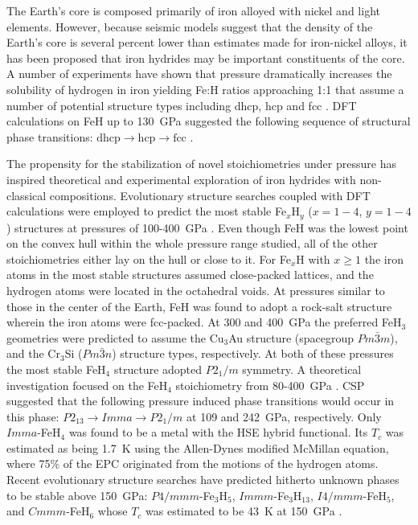 \documentclass[12pt,letterpaper,oneside]{article}
\begin{document}
The Earth's core is composed primarily of iron alloyed with nickel and light elements. However, because seismic models suggest that the density of the Earth's core is several percent lower than estimates made for iron-nickel alloys, it has been proposed that iron hydrides may be important constituents of the core. A number of experiments have shown that pressure dramatically increases the solubility of hydrogen in iron \cite{Fukai:1982} yielding Fe:H ratios approaching 1:1 \cite{Badding:1991} that assume a number of potential structure types including dhcp, hcp and fcc \cite{Yamakata:1992,Antonov:2002,Narygina:2011}. DFT calculations on FeH up to 130~GPa suggested the following sequence of structural phase transitions: $\text{dhcp}\rightarrow \text{hcp} \rightarrow \text{fcc}$ \cite{Isaev:2007}. 

The propensity for the stabilization of novel stoichiometries under pressure has inspired theoretical and experimental exploration of iron hydrides with non-classical compositions.
Evolutionary structure searches coupled with DFT calculations were employed to predict the most stable Fe$_x$H$_y$ ($x=1-4$, $y=1-4$) structures at pressures of 100-400~GPa \cite{Bazhanova:2012a}. Even though FeH was the lowest point on the convex hull within the whole pressure range studied, all of the other stoichiometries either lay on the hull or close to it. For Fe$_x$H with $x\ge1$ the iron atoms in the most stable structures assumed close-packed lattices, and the hydrogen atoms were located in the octahedral voids. At pressures similar to those in the center of the Earth, FeH was found to adopt a rock-salt structure wherein the iron atoms were fcc-packed. At 300 and 400~GPa the preferred FeH$_3$ geometries were predicted to assume the Cu$_3$Au structure (spacegroup $Pm\bar{3}m$), and the Cr$_3$Si ($Pm\bar{3}n$) structure types, respectively. At both of these pressures the most stable FeH$_4$ structure adopted $P2_1/m$ symmetry. A theoretical investigation focused on the FeH$_4$ stoichiometry from 80-400~GPa \cite{Li:2017a}. CSP suggested that the following pressure induced phase transitions would occur in this phase: $P2_13 \rightarrow Imma \rightarrow P2_1/m$ at 109 and 242~GPa, respectively. Only $Imma$-FeH$_4$ was found to be a metal with the HSE hybrid functional. Its $T_c$ was estimated as being 1.7~K using the Allen-Dynes modified McMillan equation, where 75\% of the EPC originated from the motions of the hydrogen atoms. Recent evolutionary structure searches have predicted hitherto unknown phases to be stable above 150~GPa: $P4/mmm$-Fe$_3$H$_5$, $Immm$-Fe$_3$H$_{13}$, $I4/mmm$-FeH$_5$, and $Cmmm$-FeH$_6$ whose $T_c$ was estimated to be 43~K at 150~GPa \cite{Kvashnin:2018a}.  
\end{document}

